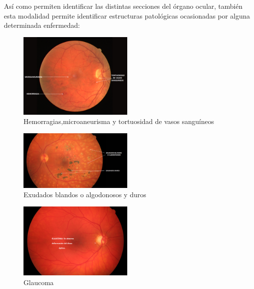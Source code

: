 As\'i como permiten identificar las distintas secciones del \'organo ocular, tambi\'en esta modalidad permite identificar estructuras patol\'ogicas ocasionadas por alguna determinada enfermedad:
\begin{figure}[H]
	{
	\centering
	\includegraphics[width=0.5\textwidth]{Figures/HMT}
	\caption[HMT]{Hemorragias,microaneurisma y tortuosidad de vasos sangu\'ineos}
	\label{fig:Hemorragias,microaneurisma y tortuosidad de vasos sangu\'ineos}
	}
\end{figure}

\begin{figure}[H]
	{
	\centering
	\includegraphics[width=0.5\textwidth]{Figures/EDyB}
	\caption[Exudados]{Exudados blandos o algodonosos y duros}
	\label{fig:Exudados blandos o algodonosos y duros}
	}
\end{figure}

\begin{figure}[H]
	{
	\centering
	\includegraphics[width=0.5\textwidth]{Figures/Glaucoma}
	\caption[Glaucoma]{Glaucoma}
	\label{fig:Ojo afectado por Glaucoma.}
	}
\end{figure}

